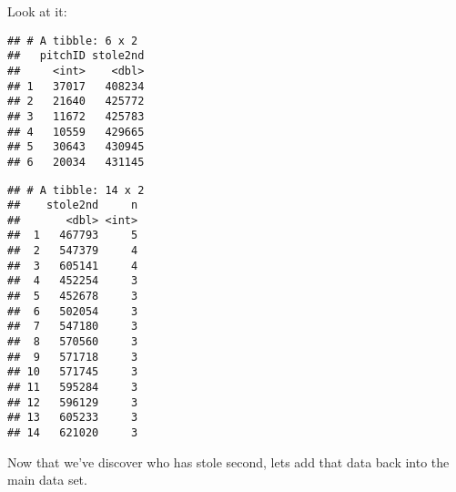 \documentclass[]{article}
\newenvironment{Shaded}{\begin{snugshade}}{\end{snugshade}}
\newcommand{\KeywordTok}[1]{\textcolor[rgb]{0.13,0.29,0.53}{\textbf{#1}}}
\newcommand{\DataTypeTok}[1]{\textcolor[rgb]{0.13,0.29,0.53}{#1}}
\newcommand{\DecValTok}[1]{\textcolor[rgb]{0.00,0.00,0.81}{#1}}
\newcommand{\StringTok}[1]{\textcolor[rgb]{0.31,0.60,0.02}{#1}}
\newcommand{\OtherTok}[1]{\textcolor[rgb]{0.56,0.35,0.01}{#1}}
\newcommand{\OperatorTok}[1]{\textcolor[rgb]{0.81,0.36,0.00}{\textbf{#1}}}
\newcommand{\NormalTok}[1]{#1}
\begin{document}
Look at it:

\begin{Shaded}
\end{Shaded}

\begin{verbatim}
## # A tibble: 6 x 2
##   pitchID stole2nd
##     <int>    <dbl>
## 1   37017   408234
## 2   21640   425772
## 3   11672   425783
## 4   10559   429665
## 5   30643   430945
## 6   20034   431145
\end{verbatim}

\begin{Shaded}
\end{Shaded}

\begin{verbatim}
## # A tibble: 14 x 2
##    stole2nd     n
##       <dbl> <int>
##  1   467793     5
##  2   547379     4
##  3   605141     4
##  4   452254     3
##  5   452678     3
##  6   502054     3
##  7   547180     3
##  8   570560     3
##  9   571718     3
## 10   571745     3
## 11   595284     3
## 12   596129     3
## 13   605233     3
## 14   621020     3
\end{verbatim}

Now that we've discover who has stole second, lets add that data back
into the main data set.
\end{document}
